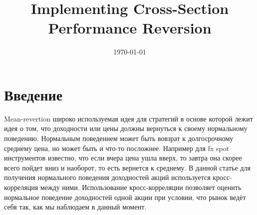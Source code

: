 \documentclass[10pt, a4paper, twocolumn]{article} %
\title{Implementing Cross-Section Performance Reversion} %
\author{
	\authorstyle{Valerii Ovchinnikov} %
}
\date{\today} %
\begin{document}
\maketitle %

\thispagestyle{firstpage} %




\section{Введение}
Mean-revertion широко используемая идея для стратегий в основе которой лежит идея о том, что доходности или цены должны
вернуться к своему нормальному поведению. Нормальным поведением может быть вовзрат к долгосрочному среднему цена,
но может быть и что-то посложнее. Например для fx spot инструментов известно, что  если вчера цена ушла вверх, то завтра
она скорее всего пойдет вниз и наоборот, то есть вернется к среднему. В данной статье для получения нормального
поведения доходностей акций используется кросс-корреляция между ними. Использование кросс-корреляции позволяет оценить
нормальное поведение доходностей одной акции при условии, что рынок ведёт себя так, как мы наблюдаем в данный момент.
\end{document}
